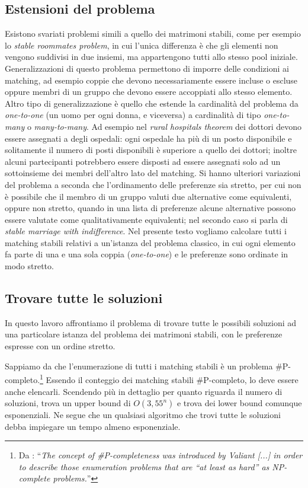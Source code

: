 \documentclass[12pt]{article}
\newcommand{\quotes}[1]{``\textit{#1}''}
\newcommand{\virg}[1]{``#1''}
\begin{document}
    \subsection{Estensioni del problema}
        Esistono svariati problemi simili a quello dei matrimoni stabili, come per esempio lo \textit{stable roommates problem}\cite{StableRoommatesProblem}, in cui l'unica differenza è che gli elementi non vengono suddivisi in due insiemi, ma appartengono tutti allo stesso pool iniziale. Generalizzazioni di questo problema permettono di imporre delle condizioni ai matching, ad esempio coppie che devono necessariamente essere incluse o escluse oppure membri di un gruppo che devono essere accoppiati allo stesso elemento. Altro tipo di generalizzazione è quello che estende la cardinalità del problema da \textit{one-to-one} (un uomo per ogni donna, e viceversa) a cardinalità di tipo \textit{one-to-many} o \textit{many-to-many}. Ad esempio nel \textit{rural hospitals theorem}\cite{RuralHospitals} dei dottori devono essere assegnati a degli ospedali: ogni ospedale ha più di un posto disponibile e solitamente il numero di posti disponibili è superiore a quello dei dottori; inoltre alcuni partecipanti potrebbero essere disposti ad essere assegnati solo ad un sottoinsieme dei membri dell'altro lato del matching. Si hanno ulteriori variazioni del problema a seconda che l'ordinamento delle preferenze sia stretto, per cui non è possibile che il membro di un gruppo valuti due alternative come equivalenti, oppure non stretto, quando in una lista di preferenze alcune alternative possono essere valutate come qualitativamente equivalenti; nel secondo caso si parla di \textit{stable marriage with indifference}.\cite{StableMarriageIndifference} Nel presente testo vogliamo calcolare tutti i matching stabili relativi a un'istanza del problema classico, in cui ogni elemento fa parte di una e una sola coppia (\textit{one-to-one}) e le preferenze sono ordinate in modo stretto.

    \subsection{Trovare tutte le soluzioni} \label{TrovareTutteLeSoluzioni}
    In questo lavoro affrontiamo il problema di trovare tutte le possibili soluzioni ad una particolare istanza del problema dei matrimoni stabili, con le preferenze espresse con un ordine stretto.
    
    Sappiamo da \cite{irving1986complexity} che l'enumerazione di tutti i matching stabili è un problema \#P-completo.\footnote{Da \cite{irving1986complexity}: \quotes{The concept of \#P-completeness was introduced by Valiant [...] in order to describe those enumeration problems that are \virg{at least as hard} as NP-complete problems.}} Essendo il conteggio dei matching stabili \#P-completo, lo deve essere anche elencarli. Scendendo più in dettaglio per quanto riguarda il numero di soluzioni, \cite{9719708} trova un upper bound di $O(3,55^n)$ e \cite{THURBER2002195} trova dei lower bound comunque esponenziali. Ne segue che un qualsiasi algoritmo che trovi tutte le soluzioni debba impiegare un tempo almeno esponenziale.
    
\end{document}
